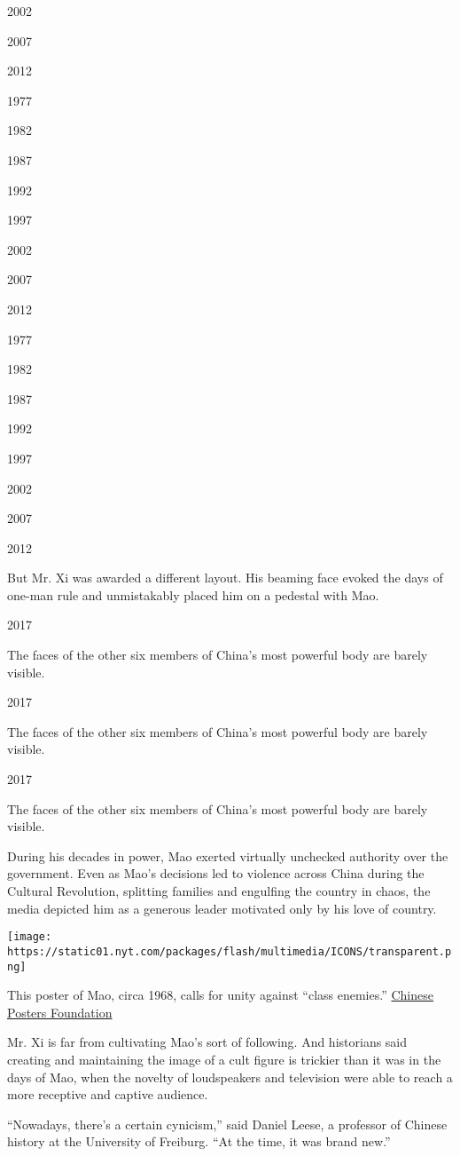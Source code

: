2002

2007

2012

1977

1982

1987

1992

1997

2002

2007

2012

1977

1982

1987

1992

1997

2002

2007

2012

But Mr. Xi was awarded a different layout. His beaming face evoked the
days of one-man rule and unmistakably placed him on a pedestal with Mao.

2017

The faces of the other six members of China's most powerful body are
barely visible.

2017

The faces of the other six members of China's most powerful body are
barely visible.

2017

The faces of the other six members of China's most powerful body are
barely visible.

During his decades in power, Mao exerted virtually unchecked authority
over the government. Even as Mao's decisions led to violence across
China during the Cultural Revolution, splitting families and engulfing
the country in chaos, the media depicted him as a generous leader
motivated only by his love of country.

\texttt{[image: https://static01.nyt.com/packages/flash/multimedia/ICONS/transparent.png]}

This poster of Mao, circa 1968, calls for unity against ``class
enemies.'' \href{https://chineseposters.net/}{Chinese Posters
Foundation}

Mr. Xi is far from cultivating Mao's sort of following. And historians
said creating and maintaining the image of a cult figure is trickier
than it was in the days of Mao, when the novelty of loudspeakers and
television were able to reach a more receptive and captive audience.

``Nowadays, there's a certain cynicism,'' said Daniel Leese, a professor
of Chinese history at the University of Freiburg. ``At the time, it was
brand new.''

